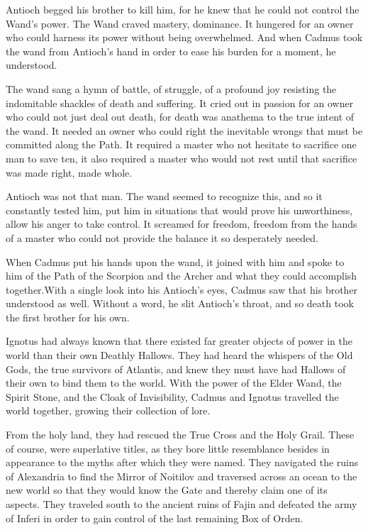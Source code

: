 Antioch begged his brother to kill him, for he knew that he could not control the Wand’s power. The Wand craved mastery, dominance. It hungered for an owner who could harness its power without being overwhelmed. And when Cadmus took the wand from Antioch’s hand in order to ease his burden for a moment, he understood.

The wand sang a hymn of battle, of struggle, of a profound joy resisting the indomitable shackles of death and suffering. It cried out in passion for an owner who could not just deal out death, for death was anathema to the true intent of the wand. It needed an owner who could right the inevitable wrongs that must be committed along the Path. It required a master who not hesitate to sacrifice one man to save ten, it also required a master who would not rest until that sacrifice was made right, made whole.

Antioch was not that man. The wand seemed to recognize this, and so it constantly tested him, put him in situations that would prove his unworthiness, allow his anger to take control. It screamed for freedom, freedom from the hands of a master who could not provide the balance it so desperately needed.

When Cadmus put his hands upon the wand, it joined with him and spoke to him of the Path of the Scorpion and the Archer and what they could accomplish together.With a single look into his Antioch’s eyes, Cadmus saw that his brother understood as well. Without a word, he slit Antioch’s throat, and so death took the first brother for his own.

Ignotus had always known that there existed far greater objects of power in the world than their own Deathly Hallows. They had heard the whispers of the Old Gods, the true survivors of Atlantis, and knew they must have had Hallows of their own to bind them to the world. With the power of the Elder Wand, the Spirit Stone, and the Cloak of Invisibility, Cadmus and Ignotus travelled the world together, growing their collection of lore.

From the holy land, they had rescued the True Cross and the Holy Grail. These of course, were superlative titles, as they bore little resemblance besides in appearance to the myths after which they were named. They navigated the ruins of Alexandria to find the Mirror of Noitilov and traversed across an ocean to the new world so that they would know the Gate and thereby claim one of its aspects. They traveled south to the ancient ruins of Fajin and defeated the army of Inferi in order to gain control of the last remaining Box of Orden.

